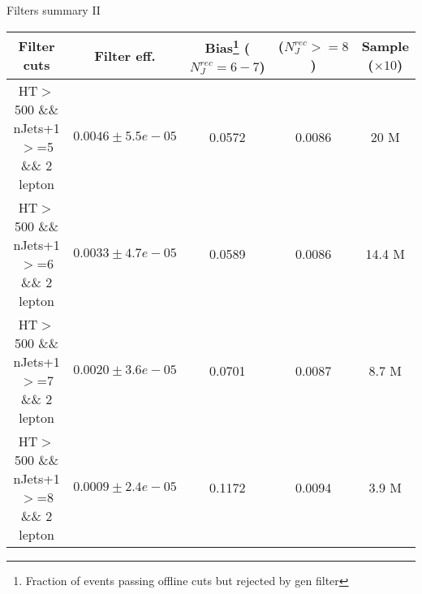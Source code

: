 \documentclass{beamer}
\begin{document}
\begin{frame}{Filters summary II}

\begin{center}
{\tiny \begin{tabular}{|c|c|c|c|c|}
\hline Filter cuts 	& Filter eff. 	& Bias\footnote{Fraction of events passing offline cuts but rejected by gen filter}  ($N_J^{rec}=6-7$)&  ($N_J^{rec}>=8$)&  Sample ($\times 10$) \\
\hline \thead{HT$>$500 \\ \&\& nJets+1$>$=5 \\ \&\& $2$ lepton} & $0.0046 \pm 5.5e-05$  & 0.0572 & 0.0086 & 20 M\\ 
\hline \thead{HT$>$500 \\ \&\& nJets+1$>$=6 \\ \&\& $2$ lepton} & $0.0033 \pm 4.7e-05$  & 0.0589 & 0.0086 & 14.4 M\\
\hline \thead{HT$>$500 \\ \&\& nJets+1$>$=7 \\ \&\& $2$ lepton} & $0.0020 \pm 3.6e-05$  & 0.0701 & 0.0087 & 8.7 M\\ 
\hline \thead{HT$>$500 \\ \&\& nJets+1$>$=8 \\ \&\& $2$ lepton} & $0.0009 \pm 2.4e-05$  & 0.1172 & 0.0094 & 3.9 M\\
\hline 
\end{tabular} }
\end{center}

\end{frame}
\end{document}
